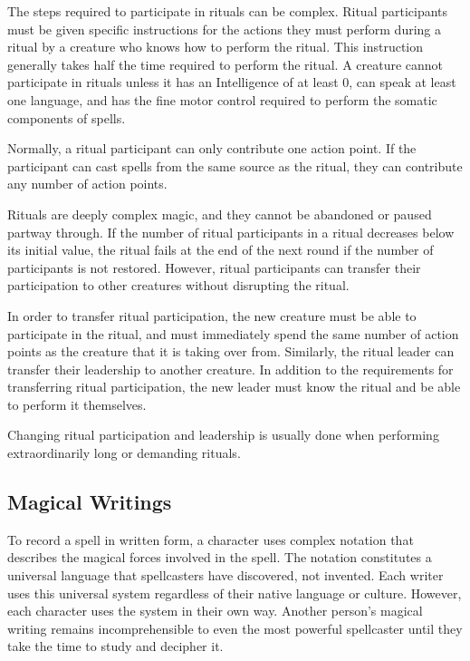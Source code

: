             The steps required to participate in rituals can be complex.
            Ritual participants must be given specific instructions for the actions they must perform during a ritual by a creature who knows how to perform the ritual.
            This instruction generally takes half the time required to perform the ritual.
            A creature cannot participate in rituals unless it has an Intelligence of at least 0, can speak at least one language, and has the fine motor control required to perform the somatic components of spells.

            Normally, a ritual participant can only contribute one action point.
            If the participant can cast spells from the same source as the ritual, they can contribute any number of action points.

            Rituals are deeply complex magic, and they cannot be abandoned or paused partway through.
            If the number of ritual participants in a ritual decreases below its initial value, the ritual fails at the end of the next round if the number of participants is not restored.
            However, ritual participants can transfer their participation to other creatures without disrupting the ritual.

            In order to transfer ritual participation, the new creature must be able to participate in the ritual, and must immediately spend the same number of action points as the creature that it is taking over from.
            Similarly, the ritual leader can transfer their leadership to another creature.
            In addition to the requirements for transferring ritual participation, the new leader must know the ritual and be able to perform it themselves.

            Changing ritual participation and leadership is usually done when performing extraordinarily long or demanding rituals.

    \subsection{Magical Writings}
        To record a spell in written form, a character uses complex notation that describes the magical forces involved in the spell.
        The notation constitutes a universal language that spellcasters have discovered, not invented.
        Each writer uses this universal system regardless of their native language or culture.
        However, each character uses the system in their own way.
        Another person's magical writing remains incomprehensible to even the most powerful spellcaster until they take the time to study and decipher it.

